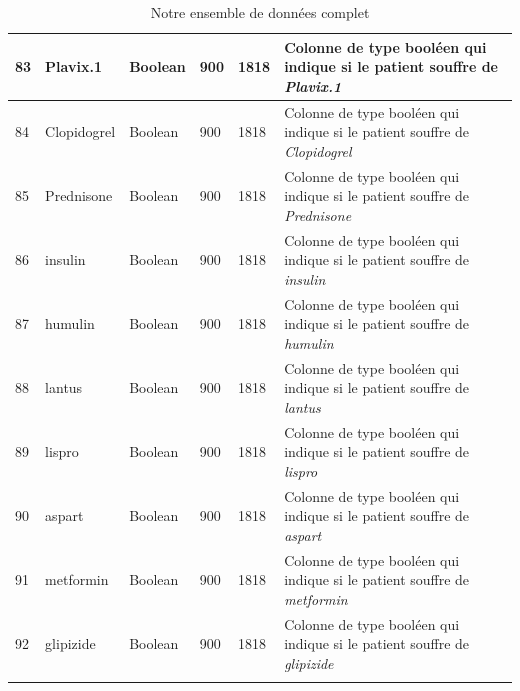 \documentclass[12pt, french]{report}
\begin{document}
\begin{longtable}{| p{} | p{} | p{} | p{}  | p{} | p{} |  }
83 &	Plavix.1 & Boolean & 900 & 1818& Colonne de type booléen qui indique si le patient souffre  de \textit{Plavix.1} \\ \hline 
84 &	Clopidogrel & Boolean & 900 & 1818& Colonne de type booléen qui indique si le patient souffre  de \textit{Clopidogrel} \\ \hline 
85 &	Prednisone & Boolean & 900 & 1818& Colonne de type booléen qui indique si le patient souffre  de \textit{Prednisone} \\ \hline 
86 &	insulin & Boolean & 900 & 1818& Colonne de type booléen qui indique si le patient souffre  de \textit{insulin} \\ \hline 
87 &	humulin & Boolean & 900 & 1818& Colonne de type booléen qui indique si le patient souffre  de \textit{humulin} \\ \hline 
88 &	lantus & Boolean & 900 & 1818& Colonne de type booléen qui indique si le patient souffre  de \textit{lantus} \\ \hline 
89 &	lispro & Boolean & 900 & 1818& Colonne de type booléen qui indique si le patient souffre  de \textit{lispro} \\ \hline 
90 &	aspart & Boolean & 900 & 1818& Colonne de type booléen qui indique si le patient souffre  de \textit{aspart} \\ \hline 
91 &	metformin & Boolean & 900 & 1818& Colonne de type booléen qui indique si le patient souffre  de \textit{metformin} \\ \hline 
92 &	glipizide & Boolean & 900 & 1818& Colonne de type booléen qui indique si le patient souffre  de \textit{glipizide} \\ \hline



\caption{Notre ensemble de données complet}
\label{tab:dt}
\end{longtable}

\newpage
{}


 	
\end{document}
